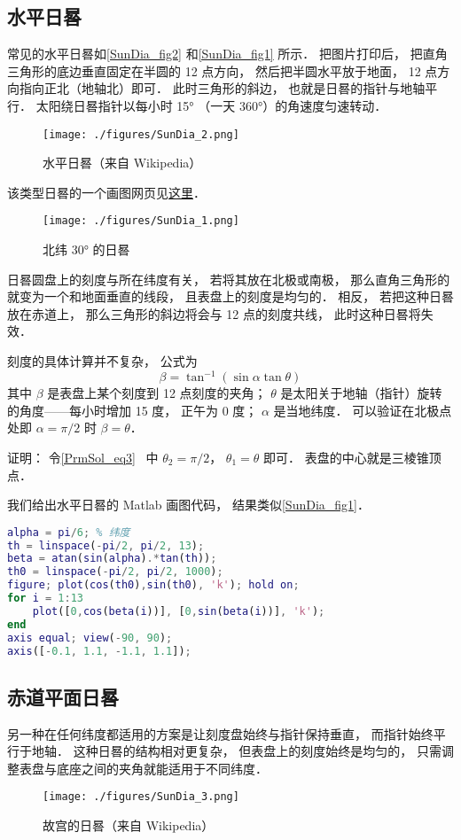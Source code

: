 
\begin{issues}
\end{issues}

\subsection{水平日晷}

常见的水平日晷如\autoref{SunDia_fig2} 和\autoref{SunDia_fig1} 所示． 把图片打印后， 把直角三角形的底边垂直固定在半圆的 12 点方向， 然后把半圆水平放于地面， 12 点方向指向正北（地轴北）即可． 此时三角形的斜边， 也就是日晷的指针与地轴平行． 太阳绕日晷指针以每小时 15° （一天 360°）的角速度匀速转动．

\begin{figure}[ht]
\centering
\texttt{[image: ./figures/SunDia\_2.png]}
\caption{水平日晷（来自 Wikipedia）} \label{SunDia_fig2}
\end{figure}
该类型日晷的一个画图网页见\href{https://www.blocklayer.com/sundial.aspx}{这里}．
\begin{figure}[ht]
\centering
\texttt{[image: ./figures/SunDia\_1.png]}
\caption{北纬 30° 的日晷} \label{SunDia_fig1}
\end{figure}

日晷圆盘上的刻度与所在纬度有关， 若将其放在北极或南极， 那么直角三角形的就变为一个和地面垂直的线段， 且表盘上的刻度是均匀的． 相反， 若把这种日晷放在赤道上， 那么三角形的斜边将会与 12 点的刻度共线， 此时这种日晷将失效．

刻度的具体计算并不复杂， 公式为
\begin{equation}
\beta = \tan^{-1}(\sin\alpha \tan \theta)
\end{equation}
其中 $\beta$ 是表盘上某个刻度到 12 点刻度的夹角； $\theta$ 是太阳关于地轴（指针）旋转的角度——每小时增加 15 度， 正午为 0 度； $\alpha$ 是当地纬度． 可以验证在北极点处即 $\alpha = \pi/2$ 时 $\beta = \theta$．

证明： 令\autoref{PrmSol_eq3}~ 中 $\theta_2 = \pi/2$， $\theta_1 = \theta$ 即可． 表盘的中心就是三棱锥顶点．

我们给出水平日晷的 Matlab 画图代码， 结果类似\autoref{SunDia_fig1}．
\begin{lstlisting}[language=matlab, caption=sunDial.m]
alpha = pi/6; % 纬度
th = linspace(-pi/2, pi/2, 13);
beta = atan(sin(alpha).*tan(th));
th0 = linspace(-pi/2, pi/2, 1000);
figure; plot(cos(th0),sin(th0), 'k'); hold on;
for i = 1:13
    plot([0,cos(beta(i))], [0,sin(beta(i))], 'k');
end
axis equal; view(-90, 90);
axis([-0.1, 1.1, -1.1, 1.1]);
\end{lstlisting}

\subsection{赤道平面日晷}
另一种在任何纬度都适用的方案是让刻度盘始终与指针保持垂直， 而指针始终平行于地轴． 这种日晷的结构相对更复杂， 但表盘上的刻度始终是均匀的， 只需调整表盘与底座之间的夹角就能适用于不同纬度．
\begin{figure}[ht]
\centering
\texttt{[image: ./figures/SunDia\_3.png]}
\caption{故宫的日晷（来自 Wikipedia）} \label{SunDia_fig3}
\end{figure}
